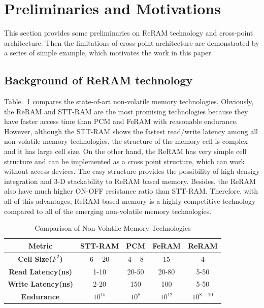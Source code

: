 \vspace{10pt}
\section{Preliminaries and Motivations}

This section provides some preliminaries on ReRAM technology and cross-point architecture. Then the limitations of cross-point architecture are demonstrated by a series of simple example, which motivates the work in this paper.

\subsection{Background of ReRAM technology}
Table.~\ref{table:compare} compares the state-of-art non-volatile memory technologies. Obviously, the ReRAM and STT-RAM are the most promising technologies because they have faster access time than PCM and FeRAM with reasonable endurance. However, although the STT-RAM shows the fastest read/write latency among all non-volatile memory technologies, the structure of the memory cell is complex and it has large cell size. On the other hand, the ReRAM has very simple cell structure and can be implemented as a cross point structure, which can work without access devices. The easy structure provides the possibility of high densigy integration and 3-D stackability to ReRAM based memory. Besides, the ReRAM also have much higher ON-OFF resistance ratio than STT-RAM. Therefore, with all of this advantages, ReRAM based memory is a highly competitive
technology compared to all of the emerging non-volatile memory technologies.

\begin{table}[!b]
  \centering
  \scriptsize
    \scriptsize
  \caption{Comparison of Non-Volatile Memory Technologies}\label{table:compare}
  \vspace{-5pt}
  \begin{tabular}{|c|cccc|}
    \hline
    \textbf{Metric} & \textbf{STT-RAM} & \textbf{PCM}    & \textbf{FeRAM} & \textbf{ReRAM}
    \\\hline
    \textbf{Cell Size($F^2$)} & $6-20$ & $4-8$ & $15$ & $4$\\\hline
    \textbf{Read Latency(ns)} &  1-10 & 20-50 & 20-80 & 5-50\\\hline
    \textbf{Write Latency(ns)} & 2-20& 150& 100& 5-50\\\hline
    \textbf{Endurance} &  $10^{15}$ & $10^8$ & $10^{12}$ & $10^{8-10}$\\\hline
  \end{tabular}
  \vspace{-10pt}
\end{table}


